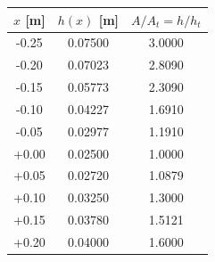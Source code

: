 \begin{tabular}{ccc}
\toprule
$x$ [m] & $h(x)$ [m] & $A/A_t=h/h_t$ \\
\midrule
-0.25 & 0.07500 & 3.0000 \\
-0.20 & 0.07023 & 2.8090 \\
-0.15 & 0.05773 & 2.3090 \\
-0.10 & 0.04227 & 1.6910 \\
-0.05 & 0.02977 & 1.1910 \\
+0.00 & 0.02500 & 1.0000 \\
+0.05 & 0.02720 & 1.0879 \\
+0.10 & 0.03250 & 1.3000 \\
+0.15 & 0.03780 & 1.5121 \\
+0.20 & 0.04000 & 1.6000 \\
\bottomrule
\end{tabular}